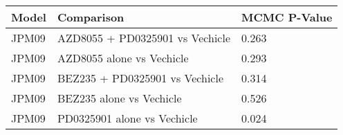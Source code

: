 \begin{table}[ht]
\centering
\begin{tabular}{lll}
  \hline
Model & Comparison & MCMC P-Value \\ 
  \hline
JPM09 & AZD8055 + PD0325901 vs Vechicle & 0.263 \\ 
  JPM09 & AZD8055 alone vs Vechicle & 0.293 \\ 
  JPM09 & BEZ235 + PD0325901 vs Vechicle & 0.314 \\ 
  JPM09 & BEZ235 alone vs Vechicle & 0.526 \\ 
  JPM09 & PD0325901 alone vs Vechicle & 0.024 \\ 
   \hline
\end{tabular}
\end{table}
